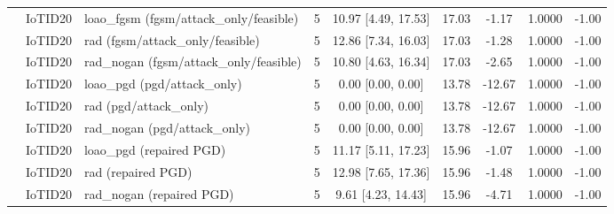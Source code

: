 \begin{table}[t]
\begin{tabular}{lllcccccc}
 & IoTID20 & loao\_fgsm (fgsm/attack\_only/feasible) & 5 & 10.97 [4.49, 17.53] & 17.03 & -1.17 & 1.0000 & -1.00 \\
 & IoTID20 & rad (fgsm/attack\_only/feasible) & 5 & 12.86 [7.34, 16.03] & 17.03 & -1.28 & 1.0000 & -1.00 \\
 & IoTID20 & rad\_nogan (fgsm/attack\_only/feasible) & 5 & 10.80 [4.63, 16.34] & 17.03 & -2.65 & 1.0000 & -1.00 \\
 & IoTID20 & loao\_pgd (pgd/attack\_only) & 5 & 0.00 [0.00, 0.00] & 13.78 & -12.67 & 1.0000 & -1.00 \\
 & IoTID20 & rad (pgd/attack\_only) & 5 & 0.00 [0.00, 0.00] & 13.78 & -12.67 & 1.0000 & -1.00 \\
 & IoTID20 & rad\_nogan (pgd/attack\_only) & 5 & 0.00 [0.00, 0.00] & 13.78 & -12.67 & 1.0000 & -1.00 \\
 & IoTID20 & loao\_pgd (repaired PGD) & 5 & 11.17 [5.11, 17.23] & 15.96 & -1.07 & 1.0000 & -1.00 \\
 & IoTID20 & rad (repaired PGD) & 5 & 12.98 [7.65, 17.36] & 15.96 & -1.48 & 1.0000 & -1.00 \\
 & IoTID20 & rad\_nogan (repaired PGD) & 5 & 9.61 [4.23, 14.43] & 15.96 & -4.71 & 1.0000 & -1.00 \\
\bottomrule
\end{tabular}
\end{table}
